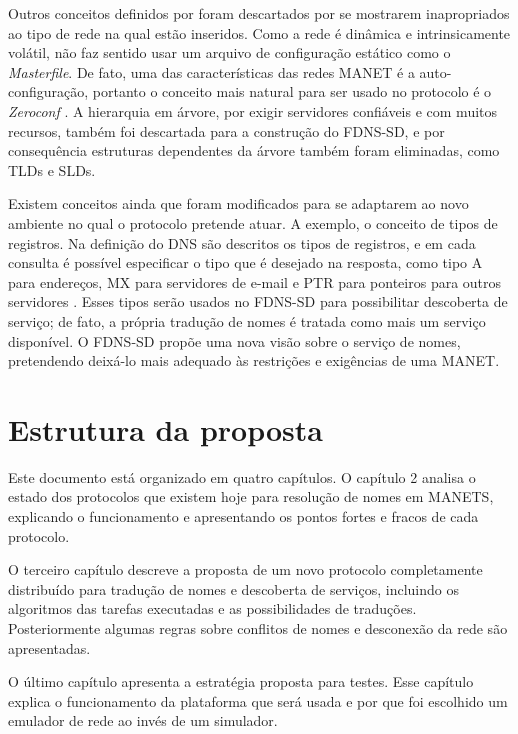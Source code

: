 Outros conceitos definidos por \cite{rfc1035} foram descartados por se mostrarem
inapropriados ao tipo de rede na qual estão inseridos. Como a rede é dinâmica e
intrinsicamente volátil, não faz sentido usar um arquivo de configuração estático
como o \textit{Masterfile}. De fato, uma das características das redes MANET é a
auto-configuração, portanto o conceito mais natural para ser usado no protocolo
é o \textit{Zeroconf} \cite{zeroconf}. A hierarquia em árvore, por exigir servidores
confiáveis e com muitos recursos, também foi descartada para a construção do
FDNS-SD, e por consequência estruturas dependentes da árvore também foram eliminadas,
como TLDs e SLDs.

Existem conceitos ainda que foram modificados para se adaptarem ao novo ambiente
no qual o protocolo pretende atuar. A exemplo, o conceito de tipos de registros.
Na definição do DNS são descritos os tipos de registros, e em cada consulta é
possível especificar o tipo que é desejado na resposta, como tipo A para endereços,
MX para servidores de e-mail e PTR para ponteiros para outros servidores \cite{rfc1035}.
Esses tipos serão usados no FDNS-SD para possibilitar descoberta de serviço; de
fato, a própria tradução de nomes é tratada como mais um serviço disponível. O
FDNS-SD propõe uma nova visão sobre o serviço de nomes, pretendendo deixá-lo mais
adequado às restrições e exigências de uma MANET.

\section{Estrutura da proposta}

Este documento está organizado em quatro capítulos. O capítulo 2 analisa o estado
dos protocolos que existem hoje para resolução de nomes em MANETS, explicando o
funcionamento e apresentando os pontos fortes e fracos de cada protocolo.

O terceiro capítulo descreve a proposta de um novo protocolo completamente
distribuído para tradução de nomes e descoberta de serviços, incluindo os
algoritmos das tarefas executadas e as possibilidades de traduções. Posteriormente
algumas regras sobre conflitos de nomes e desconexão da rede são apresentadas.

O último capítulo apresenta a estratégia proposta para testes. Esse capítulo
explica o funcionamento da plataforma que será usada e por que foi escolhido um
emulador de rede ao invés de um simulador.